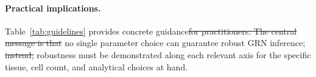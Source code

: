 \documentclass[12pt]{article}
\providecommand{\DIFaddtex}[1]{{\protect\color{blue}\uwave{#1}}} %
\providecommand{\DIFdeltex}[1]{{\protect\color{red}\sout{#1}}}                      %
\providecommand{\DIFaddbegin}{} %
\providecommand{\DIFaddend}{} %
\providecommand{\DIFdelbegin}{} %
\providecommand{\DIFdelend}{} %
\providecommand{\DIFadd}[1]{\texorpdfstring{\DIFaddtex{#1}}{#1}} %
\providecommand{\DIFdel}[1]{\texorpdfstring{\DIFdeltex{#1}}{}} %
\begin{document}
\paragraph{Practical implications.}
Table~\ref{tab:guidelines} provides concrete guidance\DIFdelbegin \DIFdel{for practitioners.
The central message is that }\DIFdelend \DIFaddbegin \DIFadd{: }\DIFaddend no single
parameter choice can guarantee robust GRN inference; \DIFdelbegin \DIFdel{instead, }\DIFdelend robustness must
be demonstrated along each relevant axis for the specific tissue,
cell count, and analytical choices at hand.

\DIFdelbegin %
\end{document}
